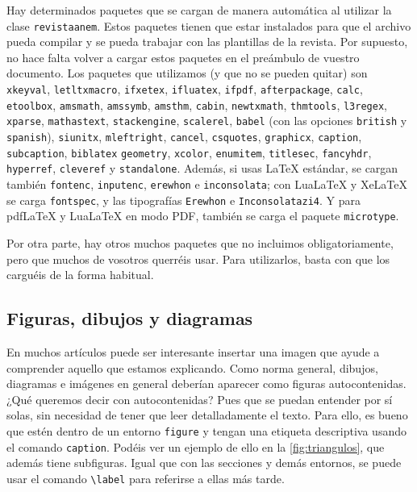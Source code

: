 \documentclass[%
extracommands,%
]{revistaanem}
\begin{document}
Hay determinados paquetes que se cargan de manera automática al utilizar la clase \verb+revistaanem+.
Estos paquetes tienen que estar instalados para que el archivo pueda compilar y se pueda trabajar con las plantillas de la revista.
Por supuesto, no hace falta volver a cargar estos paquetes en el preámbulo de vuestro documento.
Los paquetes que utilizamos (y que no se pueden quitar) son \verb+xkeyval+, \verb+letltxmacro+, \verb+ifxetex+, \verb+ifluatex+, \verb+ifpdf+, \verb+afterpackage+, \verb+calc+, \verb+etoolbox+, \verb+amsmath+, \verb+amssymb+, \verb+amsthm+, \verb+cabin+, \verb+newtxmath+,  \verb+thmtools+, \verb+l3regex+, \verb+xparse+, \verb+mathastext+, \verb+stackengine+, \verb+scalerel+, \verb+babel+ (con las opciones \verb+british+ y \verb+spanish+), \verb+siunitx+, \verb+mleftright+, \verb+cancel+, \verb+csquotes+, \verb+graphicx+, \verb+caption+, \verb+subcaption+, \verb+biblatex+ \verb+geometry+, \verb+xcolor+, \verb+enumitem+, \verb+titlesec+, \verb+fancyhdr+, \verb+hyperref+, \verb+cleveref+ y \verb+standalone+.
Además, si usas LaTeX estándar, se cargan también \verb+fontenc+, \verb+inputenc+, \verb+erewhon+ e \verb+inconsolata+; con LuaLaTeX y XeLaTeX se carga \verb+fontspec+, y las tipografías \verb+Erewhon+ e \verb+Inconsolatazi4+.
Y para pdfLaTeX y LuaLaTeX en modo PDF, también se carga el paquete \verb+microtype+.

Por otra parte, hay otros muchos paquetes que no incluimos obligatoriamente, pero que muchos de vosotros querréis usar.
Para utilizarlos, basta con que los carguéis de la forma habitual.

\subsection{Figuras, dibujos y diagramas}\label{sec:diagramas}
En muchos artículos puede ser interesante insertar una imagen que ayude a comprender aquello que estamos explicando.
Como norma general, dibujos, diagramas e imágenes en general deberían aparecer como figuras autocontenidas.
¿Qué queremos decir con autocontenidas?
Pues que se puedan entender por sí solas, sin necesidad de tener que leer detalladamente el texto.
Para ello, es bueno que estén dentro de un entorno \verb+figure+ y tengan una etiqueta descriptiva usando el comando \verb+caption+.
Podéis ver un ejemplo de ello en la \cref{fig:triangulos}, que además tiene subfiguras.
Igual que con las secciones y demás entornos, se puede usar el comando \verb+\label+ para referirse a ellas más tarde.
\end{document}
